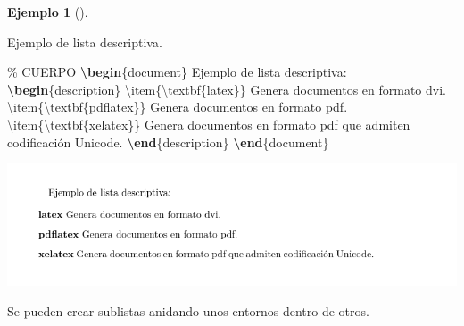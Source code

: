 \documentclass[
  a4paper,
]{scrreport}
\newenvironment{Shaded}{\begin{snugshade}}{\end{snugshade}}
\newcommand{\CommentTok}[1]{\textcolor[rgb]{0.37,0.37,0.37}{#1}}
\newcommand{\ExtensionTok}[1]{\textcolor[rgb]{0.00,0.23,0.31}{#1}}
\newcommand{\FunctionTok}[1]{\textcolor[rgb]{0.28,0.35,0.67}{#1}}
\newcommand{\KeywordTok}[1]{\textcolor[rgb]{0.00,0.23,0.31}{\textbf{#1}}}
\newcommand{\NormalTok}[1]{\textcolor[rgb]{0.00,0.23,0.31}{#1}}
\theoremstyle{definition}
\newtheorem{example}{Ejemplo}[chapter]
\theoremstyle{remark}
\begin{document}
\begin{example}[]\protect\hypertarget{exm-lista-descriptiva}{}\label{exm-lista-descriptiva}

Ejemplo de lista descriptiva.

\begin{Shaded}
\begin{Highlighting}[]
\CommentTok{\% CUERPO}
\KeywordTok{\textbackslash{}begin}\NormalTok{\{}\ExtensionTok{document}\NormalTok{\}}
\NormalTok{Ejemplo de lista descriptiva:}
\KeywordTok{\textbackslash{}begin}\NormalTok{\{}\ExtensionTok{description}\NormalTok{\}}
\FunctionTok{\textbackslash{}item}\NormalTok{\{}\FunctionTok{\textbackslash{}textbf}\NormalTok{\{latex\}\} Genera documentos en formato dvi.}
\FunctionTok{\textbackslash{}item}\NormalTok{\{}\FunctionTok{\textbackslash{}textbf}\NormalTok{\{pdflatex\}\} Genera documentos en formato pdf.}
\FunctionTok{\textbackslash{}item}\NormalTok{\{}\FunctionTok{\textbackslash{}textbf}\NormalTok{\{xelatex\}\} Genera documentos en formato pdf que admiten }
\NormalTok{codificación Unicode.}
\KeywordTok{\textbackslash{}end}\NormalTok{\{}\ExtensionTok{description}\NormalTok{\}}
\KeywordTok{\textbackslash{}end}\NormalTok{\{}\ExtensionTok{document}\NormalTok{\}}
\end{Highlighting}
\end{Shaded}

\begin{tcolorbox}[enhanced jigsaw, colframe=quarto-callout-note-color-frame, opacityback=0, title={Salida}, bottomrule=.15mm, left=2mm, coltitle=black, arc=.35mm, leftrule=.75mm, colback=white, rightrule=.15mm, colbacktitle=quarto-callout-note-color!10!white, toprule=.15mm, breakable, opacitybacktitle=0.6, bottomtitle=1mm, toptitle=1mm, titlerule=0mm]

\includegraphics{img/listas/lista-desciptiva.png}

\end{tcolorbox}

\end{example}

Se pueden crear sublistas anidando unos entornos dentro de otros.
\end{document}
